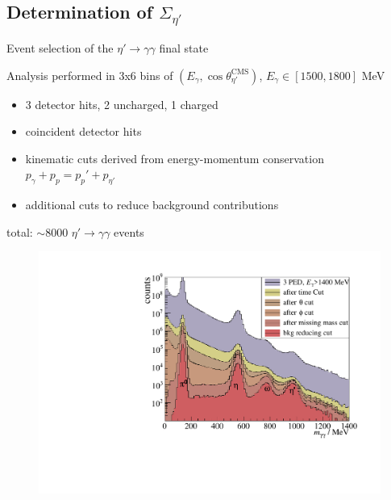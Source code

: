 \documentclass[11pt,aspectratio=169,dvipsnames]{beamer}
\begin{document}
	\subsection{Determination of $\Sigma_{\eta'}$}
	\begin{frame}{Event selection of the $\eta'\to\gamma\gamma$ final state}
		
		
		\begin{minipage}{0.49\linewidth}
			Analysis performed in 3x6 bins of $(E_\gamma,\cos\theta_{\eta'}^\text{CMS})$, $E_\gamma\in[1500,1800]$ MeV
			\begin{itemize}
				
				\item 3 detector hits, 2 uncharged, 1 charged
				\item coincident detector hits
				\item kinematic cuts derived from energy-momentum conservation $p_\gamma + p_p = p_p'+p_{\eta'}$
				\item additional cuts to reduce background contributions
			\end{itemize}
			total: $\sim 8000$ $\eta'\to\gamma\gamma$ events
		\end{minipage}
		\begin{minipage}{.5\linewidth}
			\begin{figure}
				\centering
				\includegraphics[width=1.05\linewidth]{figs/inv_mass_pretty.pdf}
			\end{figure}
		\end{minipage}
		
		
		
		
	\end{frame}
	
\end{document}
